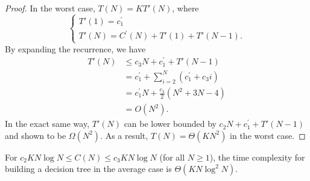 \begin{proof}
In the worst case, $T(N) = K T'(N)$, where
\begin{equation}
\begin{cases}
T'(1) = c_1^\prime \\
T'(N) = C^\prime(N) +  T'(1) + T'(N-1).
\end{cases}
\end{equation}
By expanding the recurrence, we have
\begin{align}
T'(N) &\leq c_3 N + c_1^\prime + T'(N-1) \nonumber \\
      &= c_1^\prime + \sum_{i=2}^N (c_1^\prime + c_3 i) \nonumber \\
      &= c_1^\prime N + \frac{c_3}{2} (N^2 + 3N - 4) \nonumber \\
      &= O(N^2).
\end{align}
In the exact same way, $T'(N)$ can be lower bounded by $c_2 N + c_1^\prime + T'(N-1)$
and shown to be $\Omega(N^2)$. As a result, $T(N) = \Theta(K N^2)$ in the worst case.
\end{proof}

\begin{theorem}\label{thm:6:average:knlogn}
For $c_2 K N \log N \leq C(N)\leq c_3 K N\log N$ (for all $N \geq 1$), the time complexity for building a decision
tree in the average case is  $\Theta(K N \log^2 N)$.
\end{theorem}

